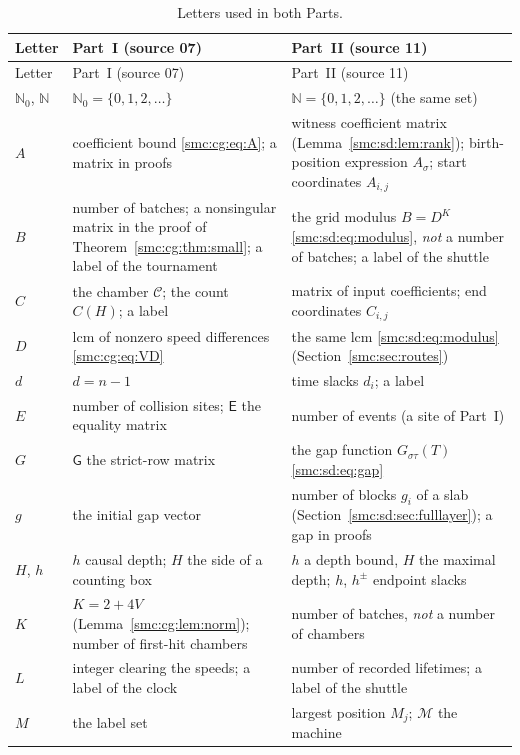 \documentclass[11pt,letterpaper]{article}
\numberwithin{equation}{section}
\theoremstyle{definition}
\theoremstyle{remark}
\newcommand{\N}{\mathbb N_0}
\newcommand{\Ccal}{\mathcal C}
\newcommand{\NN}{\mathbb N}
\newcommand{\cM}{\mathcal M}
\begin{document}
\begin{center}
\small
\begin{longtable}{@{}L{0.09\textwidth}L{0.43\textwidth}L{0.42\textwidth}@{}}
\caption{Letters used in both Parts.}\label{smc:tab:notation}\\
\toprule
Letter & Part~I (source 07) & Part~II (source 11)\\
\midrule
\endfirsthead
\toprule
Letter & Part~I (source 07) & Part~II (source 11)\\
\midrule
\endhead
$\N$, $\NN$ & $\N=\{0,1,2,\ldots\}$ & $\NN=\{0,1,2,\ldots\}$ (the same set)\\
$A$ & coefficient bound \eqref{smc:cg:eq:A}; a matrix in proofs & witness coefficient matrix (Lemma~\ref{smc:sd:lem:rank}); birth-position expression $A_\sigma$; start coordinates $A_{i,j}$\\
$B$ & number of batches; a nonsingular matrix in the proof of Theorem~\ref{smc:cg:thm:small}; a label of the tournament & the grid modulus $B=D^K$ \eqref{smc:sd:eq:modulus}, \emph{not} a number of batches; a label of the shuttle\\
$C$ & the chamber $\Ccal$; the count $C(H)$; a label & matrix of input coefficients; end coordinates $C_{i,j}$\\
$D$ & lcm of nonzero speed differences \eqref{smc:cg:eq:VD} & the same lcm \eqref{smc:sd:eq:modulus} (Section~\ref{smc:sec:routes})\\
$d$ & $d=n-1$ & time slacks $d_i$; a label\\
$E$ & number of collision sites; $\mathsf E$ the equality matrix & number of events (a site of Part~I)\\
$G$ & $\mathsf G$ the strict-row matrix & the gap function $G_{\sigma\tau}(T)$ \eqref{smc:sd:eq:gap}\\
$g$ & the initial gap vector & number of blocks $g_i$ of a slab (Section~\ref{smc:sd:sec:fulllayer}); a gap in proofs\\
$H$, $h$ & $h$ causal depth; $H$ the side of a counting box & $h$ a depth bound, $H$ the maximal depth; $h$, $h^\pm$ endpoint slacks\\
$K$ & $K=2+4V$ (Lemma~\ref{smc:cg:lem:norm}); number of first-hit chambers & number of batches, \emph{not} a number of chambers\\
$L$ & integer clearing the speeds; a label of the clock & number of recorded lifetimes; a label of the shuttle\\
$M$ & the label set & largest position $M_j$; $\cM$ the machine\\

\end{longtable}
\end{center}
\end{document}

